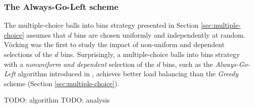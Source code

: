 \documentclass{acm_proc_article-sp}
\begin{document}
\subsubsection{The Always-Go-Left scheme}
\label{sec:AlwaysGoLeft}
The multiple-choice balls into bins strategy presented in Section \ref{sec:multiple-choice} assumes that $d$ bins are chosen uniformly and independently at random. V\"ocking \cite{VOC03} was the first to study the impact of non-uniform and dependent selections of the $d$ bins. Surprisingly, a multiple-choice balls into bins strategy with a \emph{nonuniform and dependent} selection of the $d$ bins, such as the \emph{Always-Go-Left} algorithm introduced in \cite{VOC03}, achieves better\cite{BCSV06} load balancing than the \emph{Greedy} scheme (Section \ref{sec:multiple-choice}).

TODO: algorithm
TODO: analysis




 
\end{document}
